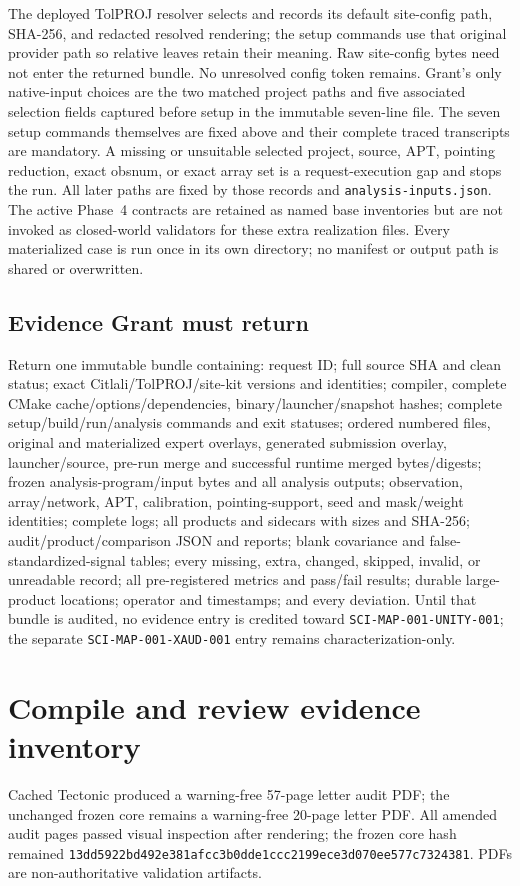 \documentclass[11pt]{article}
\newcommand{\code}[1]{\nolinkurl{#1}}
\newcommand{\digest}[8]{\texttt{#1\allowbreak#2\allowbreak#3\allowbreak#4\allowbreak#5\allowbreak#6\allowbreak#7\allowbreak#8}}
\newcommand{\AuditCoreSHA}{\digest{13dd5922}{bd492e38}{1afcc3b0}{15284216}{dde1ccc2}{199ece3d}{070ee577}{c7324381}}
\begin{document}
The deployed TolPROJ resolver selects and records its default site-config path,
SHA-256, and redacted resolved rendering; the setup commands use that original
provider path so relative leaves retain their meaning.  Raw site-config bytes
need not enter the returned bundle.  No unresolved config token remains.
Grant's only native-input choices are the
two matched project paths and five associated selection fields captured before
setup in the immutable seven-line file.  The seven setup commands themselves
are fixed above and their complete traced transcripts are mandatory.  A missing
or unsuitable selected project, source, APT, pointing reduction, exact obsnum,
or exact array set is a request-execution gap and stops the run.  All later
paths are fixed by those records and \code{analysis-inputs.json}.  The active Phase~4 contracts are
retained as named base inventories but are not invoked as closed-world
validators for these extra realization files.  Every materialized case is run
once in its own directory; no manifest or output path is shared or overwritten.

\subsection*{Evidence Grant must return}

{\raggedright Return one immutable bundle containing: request ID; full source SHA and clean
status; exact Citlali/TolPROJ/site-kit versions and identities; compiler,
complete CMake cache/options/dependencies, binary/launcher/snapshot hashes;
complete setup/build/run/analysis commands and exit statuses; ordered numbered
files, original and materialized expert overlays, generated submission overlay,
launcher/source, pre-run merge and successful runtime merged bytes/digests;
frozen analysis-program/input bytes and all analysis outputs; observation,
array/network, APT, calibration,
pointing-support, seed and mask/weight identities; complete logs; all products
and sidecars with sizes and SHA-256; audit/product/comparison JSON and reports;
blank covariance and false-standardized-signal tables; every missing, extra,
changed, skipped, invalid, or unreadable record; all pre-registered metrics and
pass/fail results; durable large-product locations; operator and timestamps;
and every deviation.  Until that bundle is audited, no evidence entry is
credited toward \code{SCI-MAP-001-UNITY-001}; the separate
\code{SCI-MAP-001-XAUD-001} entry remains characterization-only.\par}

\section{Compile and review evidence inventory}

Cached Tectonic produced a warning-free 57-page letter audit PDF; the unchanged
frozen core remains a warning-free 20-page letter PDF.  All amended audit pages
passed visual inspection after rendering; the frozen core hash remained
\AuditCoreSHA.  PDFs are non-authoritative validation artifacts.
\end{document}
